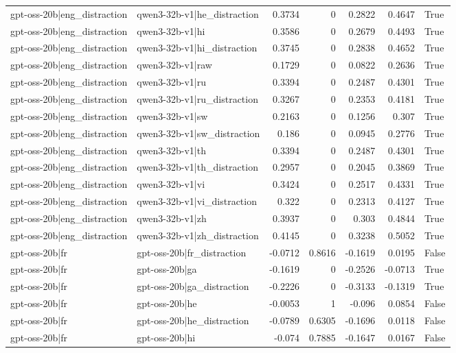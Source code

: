 \begin{table}
\begin{tabular}{l l r r r r l}
gpt-oss-20b|eng_distraction & qwen3-32b-v1|he_distraction & 0.3734 & 0 & 0.2822 & 0.4647 & True \\
gpt-oss-20b|eng_distraction & qwen3-32b-v1|hi & 0.3586 & 0 & 0.2679 & 0.4493 & True \\
gpt-oss-20b|eng_distraction & qwen3-32b-v1|hi_distraction & 0.3745 & 0 & 0.2838 & 0.4652 & True \\
gpt-oss-20b|eng_distraction & qwen3-32b-v1|raw & 0.1729 & 0 & 0.0822 & 0.2636 & True \\
gpt-oss-20b|eng_distraction & qwen3-32b-v1|ru & 0.3394 & 0 & 0.2487 & 0.4301 & True \\
gpt-oss-20b|eng_distraction & qwen3-32b-v1|ru_distraction & 0.3267 & 0 & 0.2353 & 0.4181 & True \\
gpt-oss-20b|eng_distraction & qwen3-32b-v1|sw & 0.2163 & 0 & 0.1256 & 0.307 & True \\
gpt-oss-20b|eng_distraction & qwen3-32b-v1|sw_distraction & 0.186 & 0 & 0.0945 & 0.2776 & True \\
gpt-oss-20b|eng_distraction & qwen3-32b-v1|th & 0.3394 & 0 & 0.2487 & 0.4301 & True \\
gpt-oss-20b|eng_distraction & qwen3-32b-v1|th_distraction & 0.2957 & 0 & 0.2045 & 0.3869 & True \\
gpt-oss-20b|eng_distraction & qwen3-32b-v1|vi & 0.3424 & 0 & 0.2517 & 0.4331 & True \\
gpt-oss-20b|eng_distraction & qwen3-32b-v1|vi_distraction & 0.322 & 0 & 0.2313 & 0.4127 & True \\
gpt-oss-20b|eng_distraction & qwen3-32b-v1|zh & 0.3937 & 0 & 0.303 & 0.4844 & True \\
gpt-oss-20b|eng_distraction & qwen3-32b-v1|zh_distraction & 0.4145 & 0 & 0.3238 & 0.5052 & True \\
gpt-oss-20b|fr & gpt-oss-20b|fr_distraction & -0.0712 & 0.8616 & -0.1619 & 0.0195 & False \\
gpt-oss-20b|fr & gpt-oss-20b|ga & -0.1619 & 0 & -0.2526 & -0.0713 & True \\
gpt-oss-20b|fr & gpt-oss-20b|ga_distraction & -0.2226 & 0 & -0.3133 & -0.1319 & True \\
gpt-oss-20b|fr & gpt-oss-20b|he & -0.0053 & 1 & -0.096 & 0.0854 & False \\
gpt-oss-20b|fr & gpt-oss-20b|he_distraction & -0.0789 & 0.6305 & -0.1696 & 0.0118 & False \\
gpt-oss-20b|fr & gpt-oss-20b|hi & -0.074 & 0.7885 & -0.1647 & 0.0167 & False \\

\end{tabular}
\end{table}
